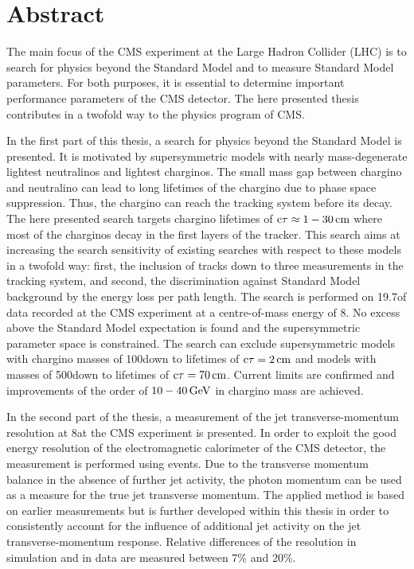 \chapter*{Abstract}

The main focus of the CMS experiment at the Large Hadron Collider (LHC) is to search for physics beyond the Standard Model and to measure Standard Model parameters.
For both purposes, it is essential to determine important performance parameters of the CMS detector.
The here presented thesis contributes in a twofold way to the physics program of CMS.

In the first part of this thesis, a search for physics beyond the Standard Model is presented.
It is motivated by supersymmetric models with nearly mass-degenerate lightest neutralinos and lightest charginos.
The small mass gap between chargino and neutralino can lead to long lifetimes of the chargino due to phase space suppression.
Thus, the chargino can reach the tracking system before its decay.
The here presented search targets chargino lifetimes of $\text{c}\tau \approx 1 - 30\,\text{cm} $ where most of the charginos decay in the first layers of the tracker. 
This search aims at increasing the search sensitivity of existing searches with respect to these models in a twofold way: first, the inclusion of tracks down to three measurements in the tracking system, and second, the discrimination against Standard Model background by the energy loss per path length.
The search is performed on 19.7\fbinv of data recorded at the CMS experiment at a centre-of-mass energy of 8\tev.
No excess above the Standard Model expectation is found and the supersymmetric parameter space is constrained.
The search can exclude supersymmetric models with chargino masses of 100\gev down to lifetimes of $\text{c}\tau=2\,\text{cm}$ and models with masses of 500\gev down to lifetimes of $\text{c}\tau=70\,\text{cm}$.
Current limits are confirmed and improvements of the order of $10-40\,\text{Ge}\kern-0.06667em\text{V}$ in chargino mass are achieved.

In the second part of the thesis, a measurement of the jet transverse-momentum resolution at 8\tev at the CMS experiment is presented.
In order to exploit the good energy resolution of the electromagnetic calorimeter of the CMS detector, the measurement is performed using \GAMJET events.
Due to the transverse momentum balance in the absence of further jet activity, the photon momentum can be used as a measure for the true jet transverse momentum. 
The applied method is based on earlier measurements but is further developed within this thesis in order to consistently account for the influence of additional jet activity on the jet transverse-momentum response.
Relative differences of the resolution in simulation and in data are measured between 7\% and 20\%. 

\clearpage
